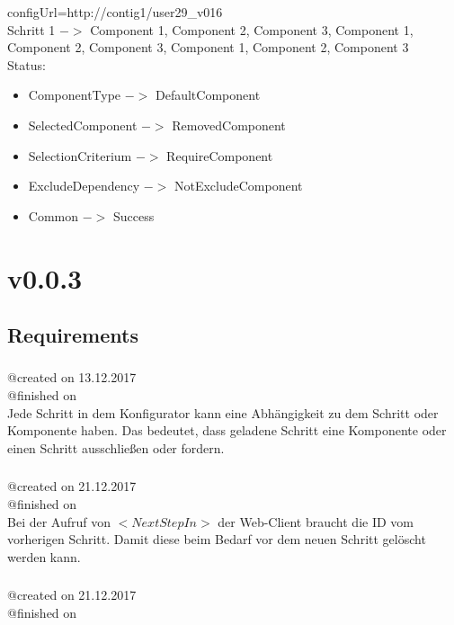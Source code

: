 \documentclass{article}
\begin{document}
configUrl=http://contig1/user29\_v016\\

\noindent Schritt 1 $->$ Component 1, Component 2, Component 3, Component 1,
Component 2, Component 3, Component 1, Component 2, Component 3\\

\noindent Status:

\begin{itemize}
  \item ComponentType $->$ DefaultComponent
  \item SelectedComponent $->$ RemovedComponent
  \item SelectionCriterium $->$ RequireComponent
  \item ExcludeDependency $->$ NotExcludeComponent
  \item Common $->$ Success
\end{itemize}

\section{v0.0.3}

\subsection{Requirements}

\subsubsection{}
@created on 13.12.2017\\
@finished on \\
Jede Schritt in dem Konfigurator kann eine Abh\"angigkeit zu dem Schritt oder
Komponente haben. Das bedeutet, dass geladene Schritt eine Komponente oder einen
Schritt ausschlie\ss{}en oder fordern.\\

\subsubsection{}
@created on 21.12.2017\\
@finished on \\

Bei der Aufruf von $<NextStepIn>$ der Web-Client braucht die ID vom vorherigen
Schritt. Damit diese beim Bedarf vor dem neuen Schritt gel\"oscht werden kann.

\subsubsection{}
@created on 21.12.2017\\
@finished on \\
\end{document}
